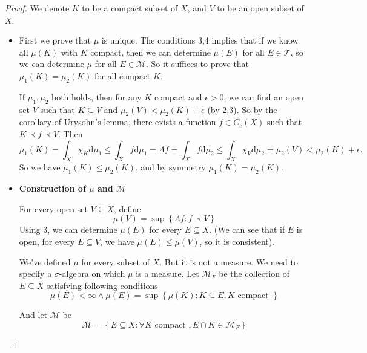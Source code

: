 \documentclass[../main.tex]{subfiles}
\begin{document}
\begin{proof}
	We denote $K$ to be a compact subset of $X$, and $V$ to be an open subset of $X$. 
	\begin{itemize}
		\item First we prove that $\mu$ is unique. The conditions 3,4 implies that if we know all $\mu(K)$ with $K$ compact, then we can determine $\mu(E)$ for all $E\in \mathcal{T}$, so we can determine $\mu$ for all $E\in \mathcal{M}$. So it suffices to prove that $\mu_1(K) = \mu_2(K)$ for all compact $K$.

		If $\mu_1,\mu_2$ both holds, then for any $K$ compact and $\epsilon>0$, we can find an open set $V$ such that $K\subseteq V$ and $\mu_2(V) < \mu_2(K) + \epsilon$ (by 2,3). So by the corollary of Urysohn's lemma, there exists a function $f\in C_c(X)$ such that $K\prec f\prec V$. Then
		\begin{equation*}
			\mu_1(K) = \int_X \chi_K \mathrm{d} \mu_1 \leq \int_X f \mathrm{d} \mu_1 = \Lambda f = \int_X f \mathrm{d} \mu_2 \leq \int_X \chi_V \mathrm{d} \mu_2 = \mu_2(V) < \mu_2(K) + \epsilon.
		\end{equation*}
		So we have $\mu_1(K)\leq \mu_2(K)$, and by symmetry $\mu_1(K) = \mu_2(K)$.

	\item \textbf{Construction of $\mu$ and $\mathcal{M}$}

		For every open set $V \subseteq X$, define
		\begin{equation*}
		\mu(V) = \sup \left\{ \Lambda f: f\prec V \right\}
		\end{equation*}
		Using 3, we can determine $\mu(E)$ for every $E \subseteq X$. (We can see that if $E$ is open, for every $E \subseteq V$, we have $\mu(E) \leq \mu(V)$, so it is consistent).

		We've defined $\mu$ for every subset of $X$. But it is not a measure. We need to specify a $\sigma$-algebra on which $\mu$ is a measure. Let $\mathcal{M}_F$ be the collection of $E \subseteq X$ satisfying following conditions
		\begin{equation*}
		\mu(E) < \infty \land \mu(E) = \sup \left\{ \mu(K): K \subseteq E, K \text{ compact } \right\}
		\end{equation*}

		And let $\mathcal{M}$ be
		\begin{equation*}
		\mathcal{M} = \left\{ E \subseteq X: \forall K \text{ compact }, E\cap K\in \mathcal{M}_F \right\}
		\end{equation*}


\end{itemize}
\end{proof}
\end{document}
